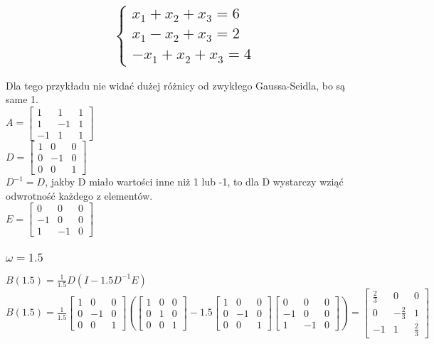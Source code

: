 \documentclass{article}
\begin{document}
\subsection{
\begin{equation*}\begin{cases}
    x_1+x_2+x_3=6\\
    x_1-x_2+x_3=2\\
    -x_1+x_2+x_3=4
\end{cases}\end{equation*}}
Dla tego przykładu nie widać dużej różnicy od zwykłego Gaussa-Seidla, bo są same 1.\\
$A=\begin{bmatrix} 1 & 1 & 1 \\ 1 & -1 & 1 \\ -1 & 1 & 1 \end{bmatrix}$\\
$D=\begin{bmatrix} 1 & 0 & 0 \\ 0 & -1 & 0 \\ 0 & 0 & 1 \end{bmatrix}$\\
$D^{-1}=D$, jakby D miało wartości inne niż 1 lub -1, to dla D wystarczy wziąć odwrotność każdego z elementów.\\
$E=\begin{bmatrix} 0 & 0 & 0 \\ -1 & 0 & 0 \\ 1 & -1 & 0 \end{bmatrix}$

\subsubsection{$\omega=1.5$}
$B(1.5)=\frac{1}{1.5}D(I-1.5D^{-1}E)$\\
$B(1.5)=\frac{1}{1.5}\begin{bmatrix} 1 & 0 & 0 \\ 0 & -1 & 0 \\ 0 & 0 & 1 \end{bmatrix}(\begin{bmatrix} 1 & 0 & 0 \\ 0 & 1 & 0 \\ 0 & 0 & 1 \end{bmatrix}-1.5\begin{bmatrix} 1 & 0 & 0 \\ 0 & -1 & 0 \\ 0 & 0 & 1 \end{bmatrix}\begin{bmatrix} 0 & 0 & 0 \\ -1 & 0 & 0 \\ 1 & -1 & 0 \end{bmatrix})=\begin{bmatrix} \frac{2}{3} & 0 & 0 \\ 0 & -\frac{2}{3} & 1 \\ -1 & 1 & \frac{2}{3} \end{bmatrix}$
\end{document}
